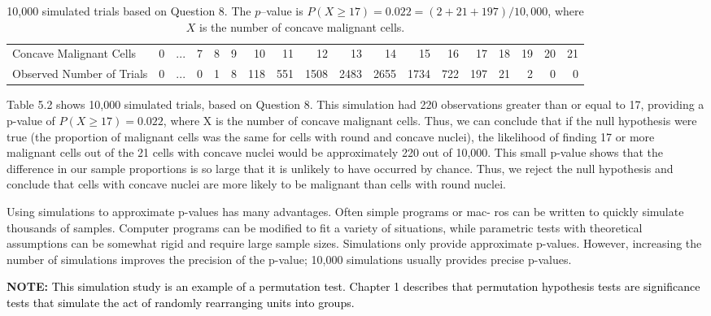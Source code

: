 \documentclass[
]{report}
\begin{document}
\begin{table}

\caption{\label{tab:tab2}10,000 simulated trials based on Question 8. The $p$–value is $P(X\ge17)=0.022=(2+21+197)/10,000$, where $X$ is the number of concave malignant cells.}
\centering
\begin{tabular}[t]{>{\raggedright\arraybackslash}p{2cm}lrrrrrrrrrrrrrrrr}
\toprule
\midrule
Concave Malignant Cells & 0 & ... & 7 & 8 & 9 & 10 & 11 & 12 & 13 & 14 & 15 & 16 & 17 & 18 & 19 & 20 & 21\\
Observed Number of Trials & 0 & ... & 0 & 1 & 8 & 118 & 551 & 1508 & 2483 & 2655 & 1734 & 722 & 197 & 21 & 2 & 0 & 0\\
\bottomrule
\end{tabular}
\end{table}

Table 5.2 shows 10,000 simulated trials, based on Question 8. This simulation had 220 observations
greater than or equal to 17, providing a p-value of \(P(X \geq 17)= 0.022\), where X is the number of concave
malignant cells. Thus, we can conclude that if the null hypothesis were true (the proportion of malignant cells
was the same for cells with round and concave nuclei), the likelihood of finding 17 or more malignant cells
out of the 21 cells with concave nuclei would be approximately 220 out of 10,000. This small p-value shows
that the difference in our sample proportions is so large that it is unlikely to have occurred by chance. Thus,
we reject the null hypothesis and conclude that cells with concave nuclei are more likely to be malignant than
cells with round nuclei.

Using simulations to approximate p-values has many advantages. Often simple programs or mac-
ros can be written to quickly simulate thousands of samples. Computer programs can be modified to
fit a variety of situations, while parametric tests with theoretical assumptions can be somewhat rigid
and require large sample sizes. Simulations only provide approximate p-values. However, increasing
the number of simulations improves the precision of the p-value; 10,000 simulations usually provides
precise p-values.

\large

\textbf{NOTE:}
\textcolor{black}{This simulation study is an example of a permutation test. Chapter 1 describes that permutation hypothesis
tests are significance tests that simulate the act of randomly rearranging units into groups.}
\normalsize

\Large
\end{document}
